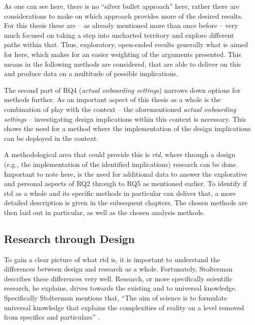 As one can see here, there is no \enquote{silver bullet approach} here, rather there are considerations to make on which approach provides more of the desired results. For this thesis these are -- as already mentioned more than once before -- very much focused on taking a step into uncharted territory and explore different paths within that. Thus, exploratory, open-ended results generally what is aimed for here, which makes for an easier weighting of the arguments presented. This means in the following methods are considered, that are able to deliver on this and produce data on a multitude of possible implications.

The second part of RQ4 (\textit{actual onboarding settings}) narrows down options for methods further. As an important aspect of this thesis as a whole is the combination of play with the context -- the aforementioned \textit{actual onboarding settings} -- investigating design implications within this context is necessary. This shows the need for a method where the implementation of the design implications can be deployed in the context.

A methodological area that could provide this is \textit{\gls{rtd}}, where through a design (e.g., the implementation of the identified implications) research can be done. Important to note here, is the need for additional data to answer the explorative and personal aspects of RQ2 through to RQ5 as mentioned earlier. To identify if \gls{rtd} as a whole and its specific methods in particular can deliver that, a more detailed description is given in the subsequent chapters. The chosen methods are then laid out in particular, as well as the chosen analysis methods.

\subsection{Research through Design}

To gain a clear picture of what \gls{rtd} is, it is important to understand the differences between design and research as a whole. Fortunately, Stolterman describes these differences very well. Research, or more specifically scientific research, he explains, drives towards the existing and to universal knowledge. Specifically Stolterman mentions that, \enquote{The aim of science is to formulate universal knowledge that explains the complexities of reality on a level removed from specifics and particulars} \cite[p. 57]{stolterman2008nature}.

